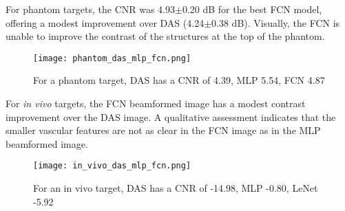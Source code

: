   For phantom targets, the CNR was 4.93$\pm$0.20 dB for the best FCN model, offering a modest improvement over DAS (4.24$\pm$0.38 dB). Visually, the FCN is unable to improve the contrast of the structures at the top of the phantom.

  \begin{figure}[htbp]
    \centerline{\texttt{[image: phantom\_das\_mlp\_fcn.png]}}
    \caption{For a phantom target, DAS has a CNR of 4.39, MLP 5.54, FCN 4.87}
    \label{fig}
  \end{figure}

  For \textit{in vivo} targets, the FCN beamformed image has a modest contrast improvement over the DAS image. A qualitative assessment indicates that the smaller vascular features are not as clear in the FCN image as in the MLP beamformed image.


  \begin{figure}[htbp]
    \centerline{\texttt{[image: in\_vivo\_das\_mlp\_fcn.png]}}
    \caption{For an in vivo target, DAS has a CNR of -14.98, MLP -0.80, LeNet -5.92}
    \label{fig}
  \end{figure}


%
%
%

%
%
%
